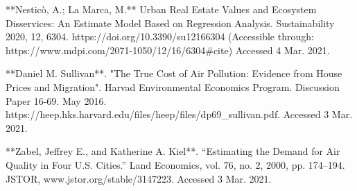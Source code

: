 \documentclass{article}
\begin{document}
\begin{markdown}
[nes]**Nesticò, A.; La Marca, M.** Urban Real Estate Values and Ecosystem Disservices: An Estimate Model Based on Regression Analysis. Sustainability 2020, 12, 6304. https://doi.org/10.3390/su12166304 (Accessible through: https://www.mdpi.com/2071-1050/12/16/6304#cite) Accessed 4 Mar. 2021.

**Daniel M. Sullivan**. "The True Cost of Air Pollution: Evidence from House Prices and Migration". Harvad Environmental Economics Program. Discussion Paper 16-69. May 2016. 
https://heep.hks.harvard.edu/files/heep/files/dp69_sullivan.pdf. Accessed 3 Mar. 2021.

**Zabel, Jeffrey E., and Katherine A. Kiel**. “Estimating the Demand for Air Quality in Four U.S. Cities.” Land Economics, vol. 76, no. 2, 2000, pp. 174–194. JSTOR, www.jstor.org/stable/3147223. Accessed 3 Mar. 2021.
\end{markdown}
\end{document}
